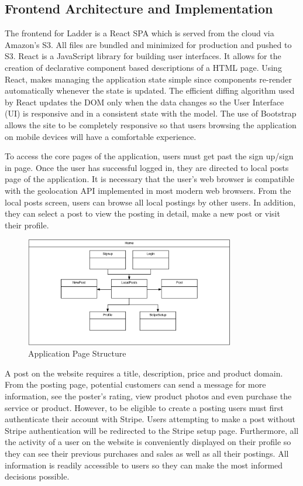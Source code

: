 \documentclass[conference]{IEEEtran}
\begin{document}
\subsection{Frontend Architecture and Implementation}
The frontend for Ladder is a React SPA which is served from the cloud via Amazon's S3. All files are bundled and minimized for production and pushed to S3. React is a JavaScript library for building user interfaces. It allows for the creation of declarative component based descriptions of a HTML page. Using React, makes managing the application state simple since components re-render automatically whenever the state is updated. The efficient diffing algorithm used by React updates the DOM only when the data changes so the User Interface (UI) is responsive and in a consistent state with the model. The use of Bootstrap allows the site to be completely responsive so that users browsing the application on mobile devices will have a comfortable experience.

To access the core pages of the application, users must get past the sign up/sign in page. Once the user has successful logged in, they are directed to local posts page of the application. It is necessary that the user's web browser is compatible with the geolocation API implemented in most modern web browsers. From the local posts screen, users can browse all local postings by other users. In addition, they can select a post to view the posting in detail, make a new post or visit their profile. 

\begin{figure}[htbp]
\centerline{\includegraphics[width=\textwidth,height=4.8cm,keepaspectratio]{structure.png}}
\caption{Application Page Structure}
\label{fig:structure}
\end{figure}

A post on the website requires a title, description, price and product domain. From the posting page, potential customers can send a message for more information, see the poster's rating, view product photos and even purchase the service or product. However, to be eligible to create a posting users must first authenticate their account with Stripe. Users attempting to make a post without Stripe authentication will be redirected to the Stripe setup page. Furthermore, all the activity of a user on the website is conveniently displayed on their profile so they can see their previous purchases and sales as well as all their postings. All information is readily accessible to users so they can make the most informed decisions possible.
\end{document}
